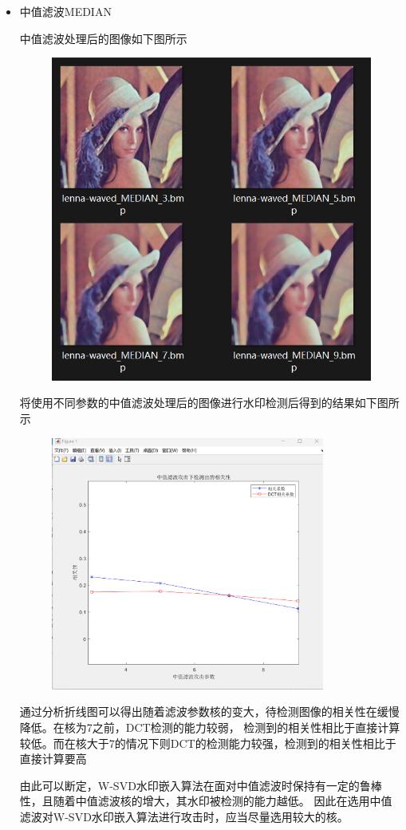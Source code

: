 \documentclass[a4paper,11pt,UTF8]{ctexart}
\newcommand{\bottomcaption}{%
\setlength{\abovecaptionskip}{6pt}%
\setlength{\belowcaptionskip}{6pt}%
\caption}
\newcommand{\xiaowuhao}{\fontsize{9pt}{\baselineskip}\selectfont}   %
\begin{document}
\begin{itemize}
      \item 中值滤波MEDIAN\par
        中值滤波处理后的图像如下图所示
        \begin{figure}[H]
          \centering
          \includegraphics[width=11cm]{imgs_median.png}
          \bottomcaption{\xiaowuhao{中值滤波处理后的图像}}
        \end{figure}
\newpage
        将使用不同参数的中值滤波处理后的图像进行水印检测后得到的结果如下图所示
        \begin{figure}[H]
          \centering
          \includegraphics[width=9cm]{attack_median.png}
          \bottomcaption{\xiaowuhao{中值滤波MEDIAN处理后的相关性}}
        \end{figure}
        通过分析折线图可以得出随着滤波参数核的变大，待检测图像的相关性在缓慢降低。在核为7之前，DCT检测的能力较弱，
        检测到的相关性相比于直接计算较低。而在核大于7的情况下则DCT的检测能力较强，检测到的相关性相比于直接计算要高\par
        由此可以断定，W-SVD水印嵌入算法在面对中值滤波时保持有一定的鲁棒性，且随着中值滤波核的增大，其水印被检测的能力越低。
        因此在选用中值滤波对W-SVD水印嵌入算法进行攻击时，应当尽量选用较大的核。


\end{itemize}
\end{document}
